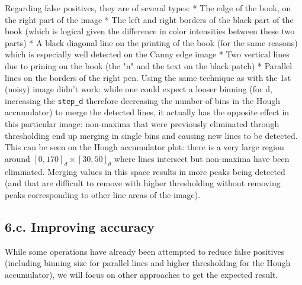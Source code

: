 \documentclass[11pt]{article}
\begin{document}
Regarding false positives, they are of several types: * The edge of the
book, on the right part of the image * The left and right borders of the
black part of the book (which is logical given the difference in color
intensities between these two parts) * A black diagonal line on the
printing of the book (for the same reasons) which is especially well
detected on the Canny edge image * Two vertical lines due to prining on
the book (the "n" and the text on the black patch) * Parallel lines on
the borders of the right pen. Using the same technique as with the 1st
(noisy) image didn't work: while one could expect a looser binning (for
d, increasing the \texttt{step\_d} therefore decreasing the number of
bins in the Hough accumulator) to merge the detected lines, it actually
has the opposite effect in this particular image: non-maxima that were
previously eliminated through thresholding end up merging in single bins
and causing new lines to be detected. This can be seen on the Hough
accumulator plot: there is a very large region around
\([0,170]_d\times[30,50]_{\theta}\) where lines intersect but non-maxima
have been eliminated. Merging values in this space results in more peaks
being detected (and that are difficult to remove with higher
thresholding without removing peaks corresponding to other line areas of
the image).

    \subsection{6.c. Improving accuracy}\label{c.-improving-accuracy}

    While some operations have already been attempted to reduce false
positives (including binning size for parallel lines and higher
thresholding for the Hough accumulator), we will focus on other
approaches to get the expected result.
\end{document}
